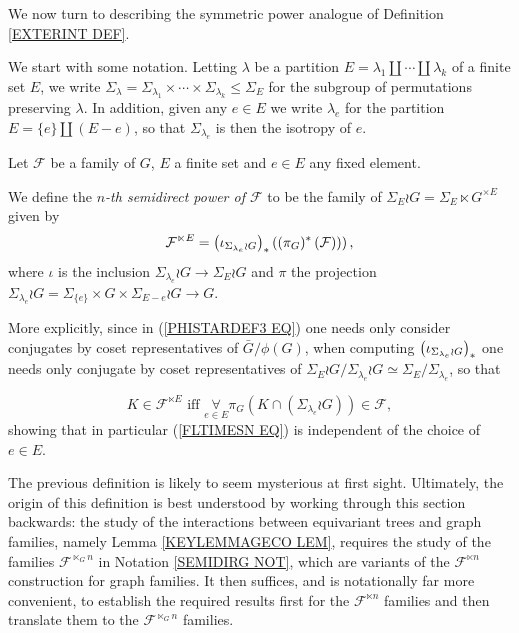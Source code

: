 \documentclass[a4paper,10pt]{article}%
\begin{document}
We now turn to describing the symmetric power analogue of 
Definition \ref{EXTERINT DEF}.

We start with some notation. Letting 
$\lambda$ be a partition 
$E = \lambda_1 \amalg\cdots \amalg \lambda_k$
of a finite set $E$, 
we write 
 $\Sigma_{\lambda} = \Sigma_{\lambda_1} \times \cdots \times
 \Sigma_{\lambda_k} \leq \Sigma_E$ for the subgroup of permutations preserving $\lambda$. 
 In addition, given any $e \in E$ we write
$\lambda_e$ for the partition $E = \{e\} \amalg (E-e)$, so that $\Sigma_{\lambda_e}$ is then the isotropy of $e$.



\begin{definition}
 Let $\mathcal{F}$ be a family of $G$,
 $E$ a finite set and $e \in E$ any fixed element.
 
We define the \textit{$n$-th semidirect power of $\mathcal{F}$} to be the family of $\Sigma_E \wr G = \Sigma_E \ltimes G^{\times E}$ given by
\begin{equation}\label{FLTIMESN EQ}
	\mathcal{F}^{\ltimes E}
		=
	\left(
	\iota_{\Sigma_{\lambda_e} \wr G}
	\right)_{\**}
	\left(
		\left(
		\pi_{G})^{\**}\left(\mathcal{F}\right)
		\right)
	\right),
\end{equation}
where $\iota$ is the inclusion 
$\Sigma_{\lambda_e} \wr G
	\to 
\Sigma_E \wr G$
and $\pi$ the projection
$\Sigma_{\lambda_e} \wr G = \Sigma_{\{e\}} \times G \times \Sigma_{E-e} \wr G
\to G$.


More explicitly, since in (\ref{PHISTARDEF3 EQ}) one needs only consider conjugates by coset representatives of $\bar{G}/\phi(G)$, when computing 
$\left( \iota_{\Sigma_{\lambda_e} \wr G}\right)_{\**}$
one needs only conjugate by coset representatives of 
$\Sigma_E \wr G/\Sigma_{\lambda_e} \wr G \simeq \Sigma_E/\Sigma_{\lambda_e}$, so that

\begin{equation}\label{FLTIMESN2 EQ}
	K \in \mathcal{F}^{\ltimes E} 
	\text{ iff }
	\underset{e \in E}{\forall} \pi_{G}
	\left(
		K \cap \left( \Sigma_{\lambda_e} \wr G \right)
	\right)
	\in \mathcal{F},
\end{equation}
showing that in particular (\ref{FLTIMESN EQ})
is independent of the choice of $e \in E$.
\end{definition}



\begin{remark}
The previous definition is likely to seem mysterious at first sight. Ultimately, the origin of this definition
is best understood by working through this section backwards:
the study of the interactions between equivariant trees and graph families, namely Lemma \ref{KEYLEMMAGECO LEM}, requires the study of the families $\mathcal{F}^{\ltimes_G n}$ in Notation \ref{SEMIDIRG NOT}, which are variants of the $\mathcal{F}^{\ltimes n}$ construction for graph families.
It then suffices, and is notationally far more convenient, to establish the required results first for the $\mathcal{F}^{\ltimes n}$ families and then translate them to the $\mathcal{F}^{\ltimes_G n}$ families.
\end{remark}
\end{document}
